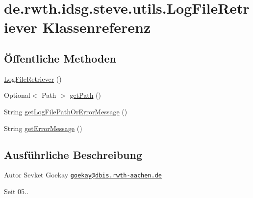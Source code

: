 \hypertarget{classde_1_1rwth_1_1idsg_1_1steve_1_1utils_1_1_log_file_retriever}{\section{de.\-rwth.\-idsg.\-steve.\-utils.\-Log\-File\-Retriever Klassenreferenz}
\label{classde_1_1rwth_1_1idsg_1_1steve_1_1utils_1_1_log_file_retriever}
}
\subsection*{Öffentliche Methoden}
\begin{DoxyCompactItemize}
\item 
\hyperlink{classde_1_1rwth_1_1idsg_1_1steve_1_1utils_1_1_log_file_retriever_a91e4f0f75a240683b642599969f721d0}{Log\-File\-Retriever} ()
\item 
Optional$<$ Path $>$ \hyperlink{classde_1_1rwth_1_1idsg_1_1steve_1_1utils_1_1_log_file_retriever_ae8f44ca96c1e0e94bd8e2814682f904a}{get\-Path} ()
\item 
String \hyperlink{classde_1_1rwth_1_1idsg_1_1steve_1_1utils_1_1_log_file_retriever_aa094c4ee2ac80d8187447ae9a08a8c5e}{get\-Log\-File\-Path\-Or\-Error\-Message} ()
\item 
String \hyperlink{classde_1_1rwth_1_1idsg_1_1steve_1_1utils_1_1_log_file_retriever_a569c4233966078156a5608a1f6e7b882}{get\-Error\-Message} ()
\end{DoxyCompactItemize}


\subsection{Ausführliche Beschreibung}
\begin{DoxyAuthor}{Autor}
Sevket Goekay \href{mailto:goekay@dbis.rwth-aachen.de}{\tt goekay@dbis.\-rwth-\/aachen.\-de} 
\end{DoxyAuthor}
\begin{DoxySince}{Seit}
05.. 
\end{DoxySince}


